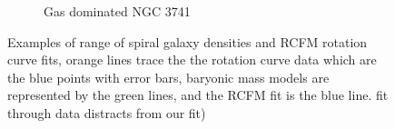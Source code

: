 \documentclass[reprint,%
 amsmath,amssymb,
 aps,
]{revtex4-1}
\begin{document}
\begin{figure}[ht]
\begin{subfigure}[c]{0.5\linewidth}
    \caption{Gas dominated NGC 3741} 
    \label{fig7:c} 
  \end{subfigure}%
  \caption{Examples of range of spiral galaxy densities and RCFM rotation curve fits,  orange lines trace the the rotation curve data which are the  blue points with error bars,  baryonic mass models are represented by the green lines, and the RCFM fit is the blue line.   fit through data distracts from our fit)  }
  \label{fig7} 
\end{figure}
 
 
    
    
     

 
\end{document}
